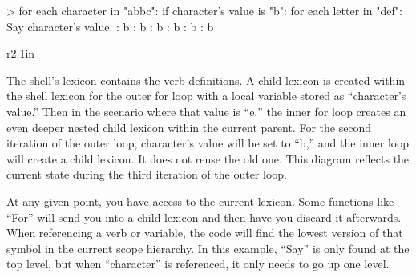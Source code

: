 \documentclass[titlepage]{article}
\begin{document}
\begin{codeblock}[caption={Scope Demonstration},label={lst:scopeDemo}]
> for each character in "abbc": if character's value is "b": for each letter in "def": Say character's value.
: b
: b
: b
: b
: b
: b
\end{codeblock}

\begin{wrapfigure}[7]{r}{2.1in}
	\hspace{1em}
\end{wrapfigure}

The shell's lexicon contains the verb definitions. A child lexicon is created within the shell lexicon for the outer for loop with a local variable stored as ``character's value.'' Then in the scenario where that value is ``e,'' the inner for loop creates an even deeper nested child lexicon within the current parent. For the second iteration of the outer loop, character's value will be set to ``b,'' and the inner loop will create a child lexicon. It does not reuse the old one. This diagram reflects the current state during the third iteration of the outer loop.

At any given point, you have access to the current lexicon. Some functions like ``For'' will send you into a child lexicon and then have you discard it afterwards. When referencing a verb or variable, the code will find the lowest version of that symbol in the current scope hierarchy. In this example, ``Say'' is only found at the top level, but when ``character'' is referenced, it only needs to go up one level.
\end{document}
